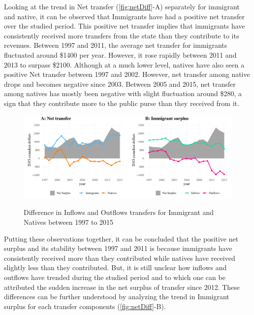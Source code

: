 \vspace{0.7em}\par
Looking at the trend in Net transfer (\autoref{fig:netDiff}-A) separately for immigrant and native, it can be observed that Immigrants have had a positive net transfer over the studied period.
This positive net transfer implies that immigrants have consistently received more transfers from the state than they contribute to its revenues.
Between 1997 and 2011, the average net transfer for immigrants fluctuated around \$1400 per year.
However, it rose rapidly between 2011 and 2013 to surpass \$2100.
Although at a much lower level, natives have also seen a positive Net transfer between 1997 and 2002.
However, net transfer among native drops and becomes negative since 2003.
Between 2005 and 2015, net transfer among natives has mostly been negative with slight fluctuation around \$280, a sign that they contribute more to the public purse than they received from it.

  \begin{figure}[H]%
    \caption{Difference in Inflows and Outflows transfers for Immigrant and Natives between 1997 to 2015}
    \includegraphics[width=1\textwidth]{res/netDiff.pdf}%
    \label{fig:netDiff}%
\end{figure}%

\vspace{0.7em}\par
Putting these observations together, it can be concluded that the positive net surplus and its stability between 1997 and 2011 is because immigrants have consistently received more than they contributed while natives have received slightly less than they contributed.
But, it is still unclear how inflows and outflows have trended during the studied period and to which one can be attributed the sudden increase in the net surplus of transfer since 2012.
These differences can be further understood by analyzing the trend in Immigrant surplus for each transfer components (\autoref{fig:netDiff}-B).

